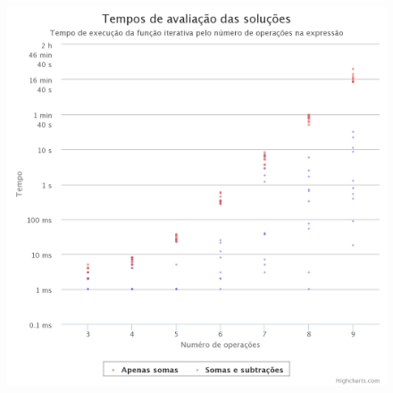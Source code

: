 \documentclass[
	12pt,				%
	openright,			%
	twoside,			%
	a4paper,			%
	english,			%
	french,				%
	spanish,			%
	brazil				%
	]{abntex2}
\begin{document}
\begin{anexosenv}
\begin{figure}[H]
	\begin{center}
	    \includegraphics[scale=0.38]{timming_test_log.png}
	\end{center}
\end{figure}

\end{anexosenv}

\printindex
\end{document}
